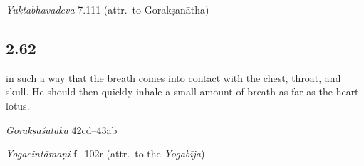 \begin{ekdosis}
\begin{testimonia}[hp02_061]
\begin{versinnote}
\end{versinnote}

\emph{Yuktabhavadeva} 7.111 (attr.~to Gorakṣanātha)

\begin{versinnote}
\end{versinnote}
\end{testimonia}


\subsection*{2.62}
\begin{translation}[hp02_062]
[\ldots] in such a way that the breath comes into contact with the chest, throat, and skull. He should then quickly inhale a small amount of breath as far as the heart lotus.
\end{translation}%

\begin{sources}[hp02_062]
\emph{Gorakṣaśataka} 42cd–43ab

\begin{versinnote}
\end{versinnote}
\end{sources}

\begin{testimonia}[hp02_062]
\emph{Yogacintāmaṇi} f.~102r (attr.~to the \emph{Yogabīja})

\begin{versinnote}
\end{versinnote}


\end{testimonia}
\end{ekdosis}
